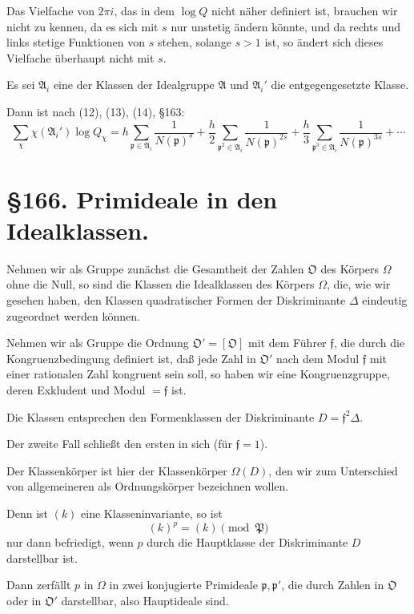 \documentclass[12pt,a4paper]{article}
\begin{document}
Das Vielfache von $2\pi i$, das in dem $\log Q$ nicht n\"aher definiert ist, brauchen wir nicht zu kennen, da es sich mit $s$ nur unstetig \"andern k\"onnte, und da rechts und links stetige Funktionen von $s$ stehen, solange $s > 1$ ist, so \"andert sich dieses Vielfache \"uberhaupt nicht mit $s$.

Es sei $\mathfrak{A}_i$ eine der Klassen der Idealgruppe $\mathfrak{A}$ und $\mathfrak{A}_i'$ die entgegengesetzte Klasse.

Dann ist nach (12), (13), (14), \S 163:
\[\sum_\chi \chi(\mathfrak{A}_i') \log Q_\chi = h \sum_{\mathfrak{p} \in \mathfrak{A}_i} \frac{1}{N(\mathfrak{p})^s} + \frac{h}{2} \sum_{\mathfrak{p}^2 \in \mathfrak{A}_i} \frac{1}{N(\mathfrak{p})^{2s}} + \frac{h}{3} \sum_{\mathfrak{p}^3 \in \mathfrak{A}_i} \frac{1}{N(\mathfrak{p})^{3s}} + \cdots\]

\section*{\S 166. Primideale in den Idealklassen.}

Nehmen wir als Gruppe zun\"achst die Gesamtheit der Zahlen $\mathfrak{O}$ des K\"orpers $\Omega$ ohne die Null, so sind die Klassen die Idealklassen des K\"orpers $\Omega$, die, wie wir gesehen haben, den Klassen quadratischer Formen der Diskriminante $\Delta$ eindeutig zugeordnet werden k\"onnen.

Nehmen wir als Gruppe die Ordnung $\mathfrak{O}' = [\mathfrak{O}]$ mit dem F\"uhrer $\mathfrak{f}$, die durch die Kongruenzbedingung definiert ist, da\ss{} jede Zahl in $\mathfrak{O}'$ nach dem Modul $\mathfrak{f}$ mit einer rationalen Zahl kongruent sein soll, so haben wir eine Kongruenzgruppe, deren Exkludent und Modul $= \mathfrak{f}$ ist.

Die Klassen entsprechen den Formenklassen der Diskriminante $D = \mathfrak{f}^2 \Delta$.

Der zweite Fall schlie\ss{}t den ersten in sich (f\"ur $\mathfrak{f} = 1$).

Der Klassenk\"orper ist hier der Klassenk\"orper $\Omega(D)$, den wir zum Unterschied von allgemeineren als Ordnungsk\"orper bezeichnen wollen.

Denn ist $(k)$ eine Klasseninvariante, so ist
\[(k)^p = (k) \pmod{\mathfrak{P}}\]
nur dann befriedigt, wenn $p$ durch die Hauptklasse der Diskriminante $D$ darstellbar ist.

Dann zerf\"allt $p$ in $\Omega$ in zwei konjugierte Primideale $\mathfrak{p}, \mathfrak{p}'$, die durch Zahlen in $\mathfrak{O}$ oder in $\mathfrak{O}'$ darstellbar, also Hauptideale sind.
\end{document}
